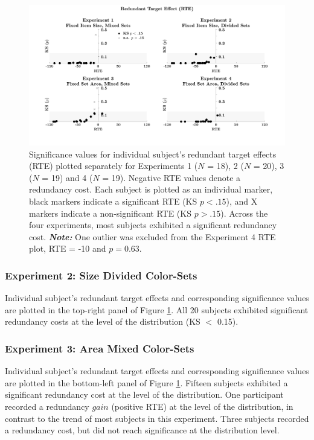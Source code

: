\begin{figure}[hbt]
\centering \includegraphics[width=\linewidth]{Figures/EstSystems/FIG7JPG.jpeg}
\caption{Significance values for individual subject's redundant target effects (RTE) plotted separately for Experiments 1 ($N$ = 18), 2 ($N$ = 20), 3 ($N$ = 19) and 4 ($N$ = 19). Negative RTE values denote a redundancy cost. Each subject is plotted as an individual marker, black markers indicate a significant RTE (KS $p < .15$), and X markers indicate a non-significant RTE (KS $p > .15$). Across the four experiments, most subjects exhibited a significant redundancy cost. \newline \emph{\bf Note:} One outlier was excluded from the Experiment 4 RTE plot, RTE = -10 and $p = 0.63.$}
\label{fig:GroupRTE}
\end{figure}


\subsubsection{Experiment 2: Size Divided Color-Sets}
Individual subject's redundant target effects and corresponding significance values are plotted in the top-right panel of Figure \ref{fig:GroupRTE}. All 20 subjects exhibited significant redundancy costs at the level of the distribution (KS $<$ 0.15). 

\subsubsection{Experiment 3: Area Mixed Color-Sets}
Individual subject's redundant target effects and corresponding significance values are plotted in the bottom-left panel of Figure \ref{fig:GroupRTE}. Fifteen subjects exhibited a significant redundancy cost at the level of the distribution. One participant recorded a redundancy $gain$ (positive RTE) at the level of the distribution, in contrast to the trend of most subjects in this experiment. Three subjects recorded a redundancy cost, but did not reach significance at the distribution level.

